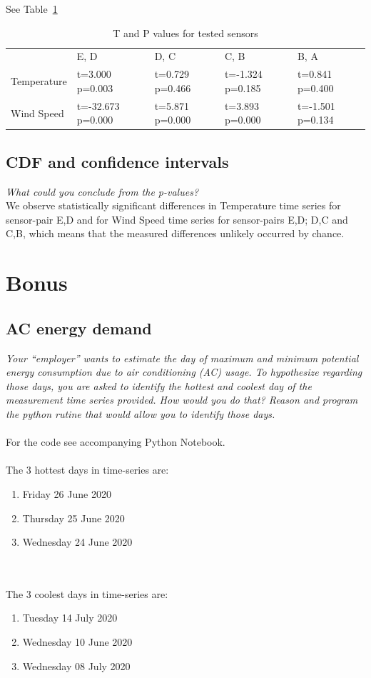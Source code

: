 \documentclass{article}
\begin{document}
See Table~\ref{tab:2}

\begin{table}[ht]
\label{tab:2}
\begin{tabular}{lllll}
            & E, D              & D, C            & C, B             & B, A             \\
Temperature & t=3.000 p=0.003   & t=0.729 p=0.466 & t=-1.324 p=0.185 & t=0.841 p=0.400  \\
Wind Speed  & t=-32.673 p=0.000 & t=5.871 p=0.000 & t=3.893 p=0.000  & t=-1.501 p=0.134
\end{tabular}
\caption{T and P values for tested sensors}
\end{table}


\subsection{CDF and confidence intervals}
\textit{
What could you conclude from the p-values?
}\\

We observe statistically significant differences in Temperature time series for sensor-pair E,D and for Wind Speed time series for sensor-pairs E,D; D,C and C,B, which means that the measured differences unlikely occurred by chance.


\newpage

\section{Bonus}

\subsection{AC energy demand}
\textit{
Your “employer” wants to estimate the day of maximum and minimum potential energy consumption due to air conditioning (AC) usage. To hypothesize regarding those days, you are asked to identify the hottest and coolest day of the measurement time series provided. How would you do that? Reason and program the python rutine that would allow you to identify those days.
}\\
\\For the code see accompanying Python Notebook.
\\
\\The 3 hottest days in time-series are:
\begin{enumerate}
\item Friday 26 June 2020
\item Thursday 25 June 2020
\item Wednesday 24 June 2020
\end{enumerate}
\\
\\The 3 coolest days in time-series are:
\item 
\begin{enumerate}
\item Tuesday 14 July 2020
\item Wednesday 10 June 2020
\item Wednesday 08 July 2020
\end{enumerate}
\end{document}
